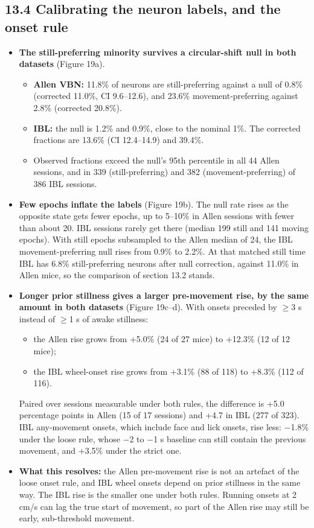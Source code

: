 \documentclass[10pt,a4paper]{article}
\begin{document}
\subsection{13.4 Calibrating the neuron labels, and the onset rule}
\begin{itemize}
\item \textbf{The still-preferring minority survives a circular-shift null in both datasets} (Figure 19a). 
\begin{itemize}
\item \textbf{Allen VBN:} 11.8\% of neurons are still-preferring against a null of 0.8\% (corrected 11.0\%, CI 9.6--12.6), and 23.6\% movement-preferring against 2.8\% (corrected 20.8\%).
\item \textbf{IBL:} the null is 1.2\% and 0.9\%, close to the nominal 1\%. The corrected fractions are 13.6\% (CI 12.4--14.9) and 39.4\%.
\item Observed fractions exceed the null's 95th percentile in all 44 Allen sessions, and in 339 (still-preferring) and 382 (movement-preferring) of 386 IBL sessions.
\end{itemize}
\item \textbf{Few epochs inflate the labels} (Figure 19b). The null rate rises as the opposite state gets fewer epochs, up to 5--10\% in Allen sessions with fewer than about 20. IBL sessions rarely get there (median 199 still and 141 moving epochs). With still epochs subsampled to the Allen median of 24, the IBL movement-preferring null rises from 0.9\% to 2.2\%. At that matched still time IBL has 6.8\% still-preferring neurons after null correction, against 11.0\% in Allen mice, so the comparison of section 13.2 stands.
\item \textbf{Longer prior stillness gives a larger pre-movement rise, by the same amount in both datasets} (Figure 19c--d). With onsets preceded by $\geq$3 s instead of $\geq$1 s of awake stillness: 
\begin{itemize}
\item the Allen rise grows from +5.0\% (24 of 27 mice) to +12.3\% (12 of 12 mice);
\item the IBL wheel-onset rise grows from +3.1\% (88 of 118) to +8.3\% (112 of 116).
\end{itemize}
 Paired over sessions measurable under both rules, the difference is +5.0 percentage points in Allen (15 of 17 sessions) and +4.7 in IBL (277 of 323). IBL any-movement onsets, which include face and lick onsets, rise less: $-$1.8\% under the loose rule, whose $-$2 to $-$1 s baseline can still contain the previous movement, and +3.5\% under the strict one.
\item \textbf{What this resolves:} the Allen pre-movement rise is not an artefact of the loose onset rule, and IBL wheel onsets depend on prior stillness in the same way. The IBL rise is the smaller one under both rules. Running onsets at 2 cm/s can lag the true start of movement, so part of the Allen rise may still be early, sub-threshold movement.
\end{itemize}
\end{document}
